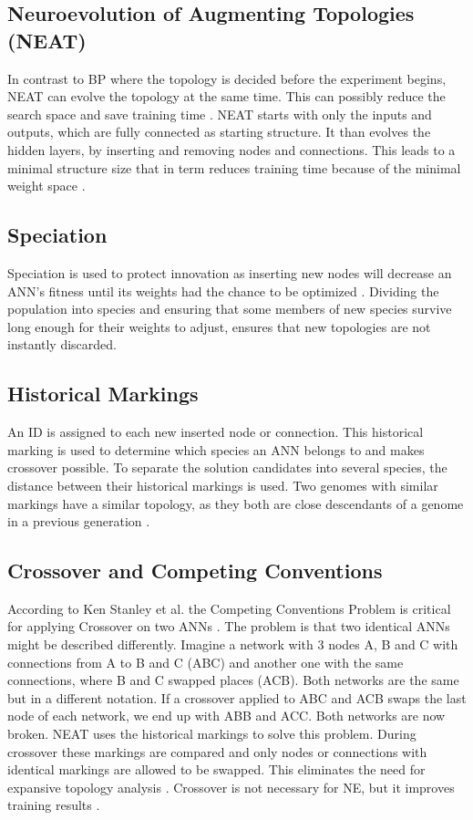 \documentclass{llncs}
\begin{document}
\subsection{Neuroevolution of Augmenting Topologies (NEAT)}
%
In contrast to BP where the topology is decided before the experiment begins, NEAT can evolve the topology at the same time. This can possibly reduce the search space and save training time \cite{Stanley.2002}. NEAT starts with only the inputs and outputs, which are fully connected as starting structure. It than evolves the hidden layers, by inserting and removing nodes and connections. This leads to a minimal structure size that in term reduces training time because of the minimal weight space \cite{Stanley.2002}.  
%
\subsection{Speciation}
%
Speciation is used to protect innovation as inserting new nodes will decrease an ANN’s fitness until its weights had the chance to be optimized \cite{Stanley.2002}. Dividing the population into species and ensuring that some members of new species survive long enough for their weights to adjust, ensures that new topologies are not instantly discarded. 
%
\subsection{Historical Markings}
%
An ID is assigned to each new inserted node or connection. This historical marking is used to determine which species an ANN belongs to and makes crossover possible. To separate the solution candidates into several species, the distance between their historical markings is used. Two genomes with similar markings have a similar topology, as they both are close descendants of a genome in a previous generation \cite{Stanley.2002}. 
%
\subsection{Crossover and Competing Conventions}
%
According to Ken Stanley et al. the Competing Conventions Problem is critical for applying Crossover on two ANNs \cite{Stanley.2002}. The problem is that two identical ANNs might be described differently. Imagine a network with 3 nodes A, B and C with connections from A to B and C (ABC) and another one with the same connections, where B and C swapped places (ACB). Both networks are the same but in a different notation. If a crossover applied to ABC and ACB swaps the last node of each network, we end up with ABB and ACC. Both networks are now broken. NEAT uses the historical markings to solve this problem. During crossover these markings are compared and only nodes or connections with identical markings are allowed to be swapped. This eliminates the need for expansive topology analysis \cite{Stanley.2002}. Crossover is not necessary for NE, but it improves training results \cite{Stanley.2002}.
%
\end{document}
